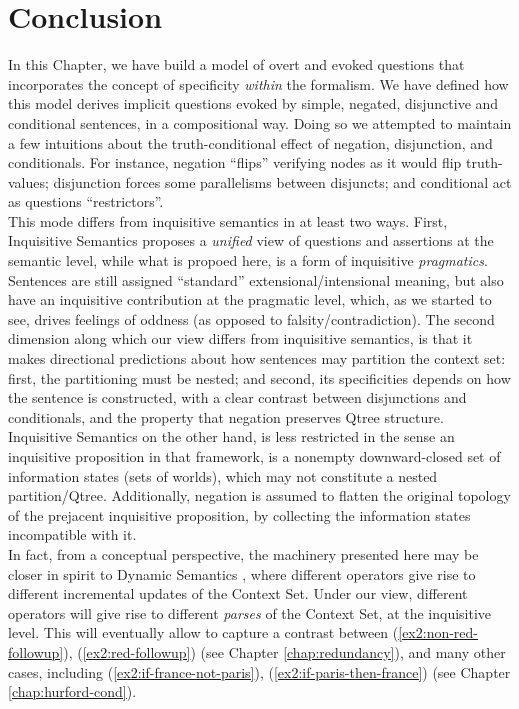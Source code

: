 \section{Conclusion}
In this Chapter, we have build a model of overt and evoked questions that incorporates the concept of specificity \textit{within} the formalism. We have defined how this model derives implicit questions evoked by simple, negated, disjunctive and conditional sentences, in a compositional way. Doing so we attempted to maintain a few intuitions about the truth-conditional effect of negation, disjunction, and conditionals. For instance, negation ``flips'' verifying nodes as it would flip truth-values; disjunction forces some parallelisms between disjuncts; and conditional act as questions ``restrictors''.\\

This mode differs from inquisitive semantics \citep{Mascarenhas2008,Ciardelli2009,Groenendijk2009,Ciardelli2018} in at least two ways. First, Inquisitive Semantics proposes a \textit{unified} view of questions and assertions at the semantic level, while what is propoed here, is a form of inquisitive \textit{pragmatics}. Sentences are still assigned ``standard'' extensional/intensional meaning, but also have an inquisitive contribution at the pragmatic level, which, as we started to see, drives feelings of oddness (as opposed to falsity/contradiction).  The second dimension along which our view differs from inquisitive semantics, is that it makes directional predictions about how sentences may partition the context set: first, the partitioning must be nested; and second, its specificities depends on how the sentence is constructed, with a clear contrast between disjunctions and conditionals, and the property that negation preserves Qtree structure. Inquisitive Semantics on the other hand, is less restricted in the sense an inquisitive proposition in that framework, is a nonempty downward-closed set of information states (sets of worlds), which may not constitute a nested partition/Qtree. Additionally, negation is assumed to flatten the original topology of the prejacent inquisitive proposition, by collecting the information states incompatible with it.\\ 

In fact, from a conceptual perspective, the machinery presented here may be closer in spirit to Dynamic Semantics \citep{Heim1983a,Heim1983b}, where different operators give rise to different incremental updates of the Context Set. Under our view, different operators will give rise to different \textit{parses} of the Context Set, at the inquisitive level. This will eventually allow to capture a contrast between (\ref{ex2:non-red-followup}), (\ref{ex2:red-followup}) (see Chapter \ref{chap:redundancy}), and many other cases, including (\ref{ex2:if-france-not-paris}), (\ref{ex2:if-paris-then-france}) (see Chapter \ref{chap:hurford-cond}).





